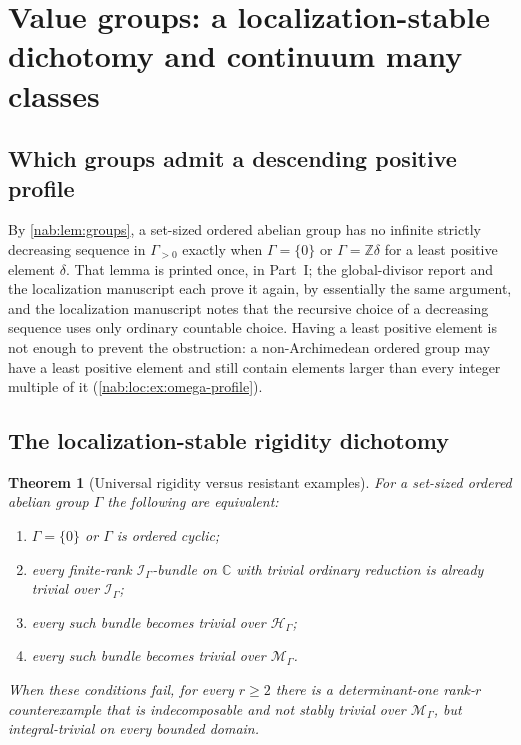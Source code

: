 \documentclass[11pt,letterpaper]{article}
\newtheorem{theorem}{Theorem}[section]
\theoremstyle{definition}
\theoremstyle{remark}
\newcommand{\C}{\mathbb C}
\newcommand{\Z}{\mathbb Z}
\newcommand{\HH}{\mathscr H_\Gamma}
\newcommand{\II}{\mathscr I_\Gamma}
\newcommand{\MM}{\mathscr M_\Gamma}
\numberwithin{equation}{section}
\begin{document}
\section{Value groups: a localization-stable dichotomy and continuum many classes}
\label{nab:loc:sec:groups}

\subsection{Which groups admit a descending positive profile}

By \cref{nab:lem:groups}, a set-sized ordered abelian group has no infinite
strictly decreasing sequence in $\Gamma_{>0}$ exactly when $\Gamma=\{0\}$ or
$\Gamma=\Z\delta$ for a least positive element $\delta$. That lemma is printed
once, in Part~I; the global-divisor report and the localization manuscript
each prove it again, by essentially the same argument, and the localization manuscript
notes that the recursive choice of a decreasing sequence uses only ordinary
countable choice. Having a least positive element is not enough to prevent the
obstruction: a non-Archimedean ordered group may have a least positive element
and still contain elements larger than every integer multiple of it
(\cref{nab:loc:ex:omega-profile}).

\subsection{The localization-stable rigidity dichotomy}

\begin{theorem}[Universal rigidity versus resistant examples]
\label{nab:loc:thm:dichotomy}
For a set-sized ordered abelian group $\Gamma$ the following are equivalent:
\begin{enumerate}[label=\textup{(\roman*)}]
\item $\Gamma=\{0\}$ or $\Gamma$ is ordered cyclic;
\item every finite-rank $\II$-bundle on $\C$ with trivial ordinary reduction is
already trivial over $\II$;
\item every such bundle becomes trivial over $\HH$;
\item every such bundle becomes trivial over $\MM$.
\end{enumerate}
When these conditions fail, for every $r\geq2$ there is a determinant-one
rank-$r$ counterexample that is indecomposable and not stably trivial over
$\MM$, but integral-trivial on every bounded domain.
\end{theorem}
\end{document}
